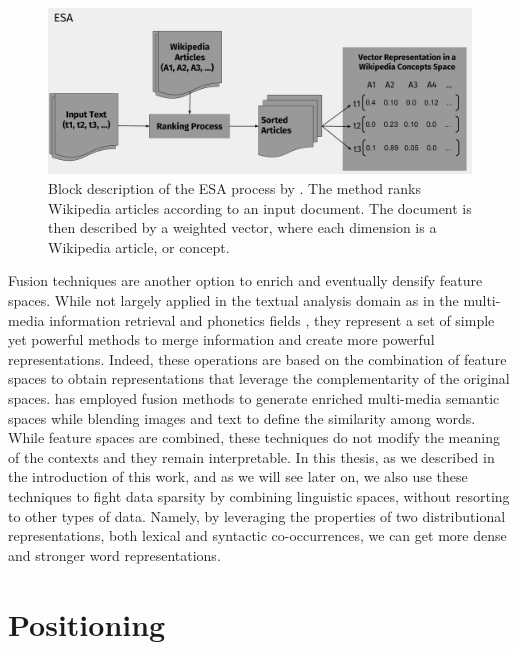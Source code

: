 \begin{figure}
\centering
\includegraphics[width=\linewidth]{images/Chapitre2/esa.pdf}
\caption{Block description of the ESA process by \cite{gabrilovich2007computing}. The method ranks Wikipedia articles according to an input document. The document is then described by a weighted vector, where each dimension is a Wikipedia article, or concept.}
\label{fig:esa}
\end{figure}

Fusion techniques are another option to enrich and eventually densify feature spaces.  While not largely applied in the textual analysis domain as in the multi-media information retrieval and phonetics fields \cite{ozkan2010latent,Ah-PineCC15}, they represent a set of simple yet powerful methods to merge information and create more powerful representations. Indeed, these operations are based on the combination of feature spaces  to obtain representations that leverage the complementarity of the original spaces. \cite{bruni2014multimodal} has employed fusion methods to generate enriched multi-media semantic spaces while blending images and text to define the similarity among words. While feature spaces are combined, these techniques do not modify the meaning of the contexts and they remain interpretable. In this thesis, as we described in the introduction of this work, and as we will see later on, we also use these techniques to fight data sparsity by combining linguistic spaces, without resorting to other types of data. Namely,  by leveraging the properties of two distributional representations, both lexical and syntactic co-occurrences, we can get more dense and stronger  word representations. 


\section{Positioning}

